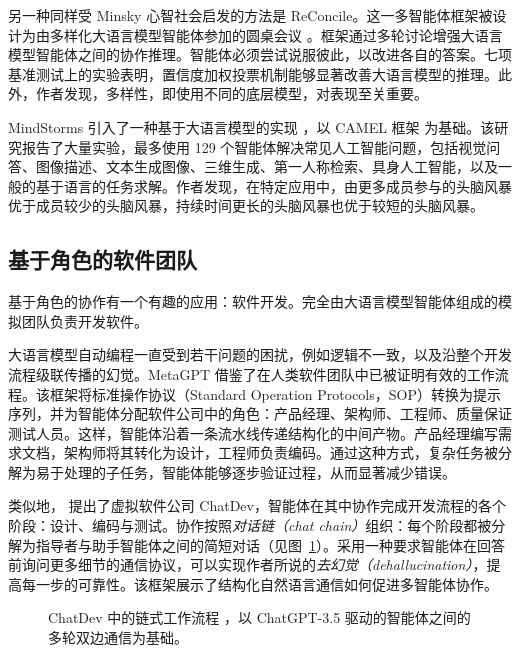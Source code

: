 另一种同样受 Minsky 心智社会启发的方法是 ReConcile。这一多智能体框架被设计为由多样化大语言模型智能体参加的圆桌会议 \citep{chen2023reconcile}。框架通过多轮讨论增强大语言模型智能体之间的协作推理。智能体必须尝试说服彼此，以改进各自的答案。七项基准测试上的实验表明，置信度加权投票机制能够显著改善大语言模型的推理。此外，作者发现，多样性，即使用不同的底层模型，对表现至关重要。

MindStorms 引入了一种基于大语言模型的实现 \citep{zhuge2023mindstorms}，以 CAMEL 框架 \citep{li2023camel} 为基础。该研究报告了大量实验，最多使用 129 个智能体解决常见人工智能问题，包括视觉问答、图像描述、文本生成图像、三维生成、第一人称检索、具身人工智能，以及一般的基于语言的任务求解。作者发现，在特定应用中，由更多成员参与的头脑风暴优于成员较少的头脑风暴，持续时间更长的头脑风暴也优于较短的头脑风暴。

\subsection{基于角色的软件团队}
基于角色的协作有一个有趣的应用：软件开发。完全由大语言模型智能体组成的模拟团队负责开发软件。

大语言模型自动编程一直受到若干问题的困扰，例如逻辑不一致，以及沿整个开发流程级联传播的幻觉。MetaGPT \citep{hong2024metagpt} 借鉴了在人类软件团队中已被证明有效的工作流程。该框架将标准操作协议（Standard Operation Protocols，SOP）转换为提示序列，并为智能体分配软件公司中的角色：产品经理、架构师、工程师、质量保证测试人员。这样，智能体沿着一条流水线传递结构化的中间产物。产品经理编写需求文档，架构师将其转化为设计，工程师负责编码。通过这种方式，复杂任务被分解为易于处理的子任务，智能体能够逐步验证过程，从而显著减少错误。

类似地，\citet{qian-etal-2024-chatdev} 提出了虚拟软件公司 ChatDev，智能体在其中协作完成开发流程的各个阶段：设计、编码与测试。协作按照\emph{对话链（chat chain）}组织：每个阶段都被分解为指导者与助手智能体之间的简短对话（见图~\ref{fig:chatdev2}）。采用一种要求智能体在回答前询问更多细节的通信协议，可以实现作者所说的\emph{去幻觉（dehallucination）}，提高每一步的可靠性。该框架展示了结构化自然语言通信如何促进多智能体协作。

\begin{figure}
  \begin{center}
    
    \caption{ChatDev 中的链式工作流程 \citep{qian-etal-2024-chatdev}，以 ChatGPT-3.5 驱动的智能体之间的多轮双边通信为基础。}\label{fig:chatdev2}
  \end{center}
\end{figure}

